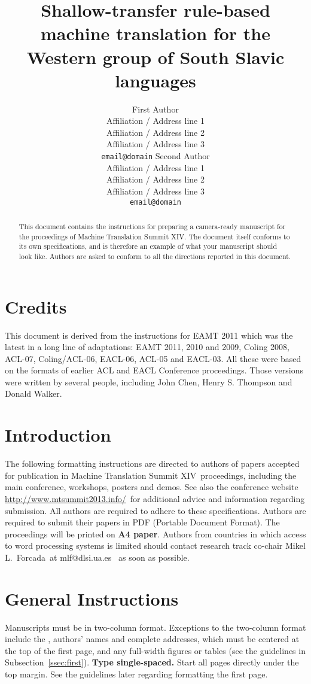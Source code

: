 \documentclass[11pt]{article}
\title{Shallow-transfer rule-based machine translation for the Western group of South Slavic languages}
\author{First Author\\
  Affiliation / Address line 1\\
  Affiliation / Address line 2\\
  Affiliation / Address line 3\\
  {\tt email@domain}  \And
  Second Author\\
  Affiliation / Address line 1\\
  Affiliation / Address line 2\\
  Affiliation / Address line 3\\
  {\tt email@domain}}
\date{}
\makeatletter
\newcommand{\confname}{Machine Translation Summit XIV}
\newcommand{\website}{\protect\url{http://www.mtsummit2013.info/}}
\newcommand{\contactname}{research track co-chair Mikel L.\ Forcada}
\newcommand{\contactemail}{mlf@dlsi.ua.es}
\makeatother
\begin{document}
\maketitle
\begin{abstract}
  This document contains the instructions for preparing a camera-ready
  manuscript for the proceedings of \confname . The document itself
  conforms to its own specifications, and is therefore an example of
  what your manuscript should look like. Authors are asked to conform
  to all the directions reported in this document.
\end{abstract}

\section{Credits}

This document is derived from the instructions for EAMT 2011 %
which was the latest in a long line of adaptations: EAMT 2011, 2010 and 2009, Coling 2008, ACL-07, Coling/ACL-06, EACL-06, ACL-05 and EACL-03.  All these were based on the formats of earlier ACL and EACL Conference proceedings.  Those versions were written by several people, including John
Chen, Henry S. Thompson and Donald Walker.

\section{Introduction}

The following formatting instructions are directed to authors of
papers accepted for publication in \confname{}~proceedings, including
the main conference, workshops, posters and demos. See also the
conference website \website~for additional 
advice and information regarding submission.  All authors are required to adhere to these
specifications. Authors are required to submit their papers in PDF  (Portable Document
Format). The proceedings will be printed on
{\bf A4 paper}. Authors from countries in which access to
word processing systems is limited should contact \contactname~at \contactemail~ as soon as possible.

\section{General Instructions}

Manuscripts must be in two-column format.  Exceptions to the
two-column format include the {}, authors' names and complete
addresses, which must be centered at the top of the first page, and
any full-width figures or tables (see the guidelines in
Subsection~\ref{ssec:first}). {\bf Type single-spaced.}  Start all
pages directly under the top margin. See the guidelines later
regarding formatting the first page.
\end{document}
